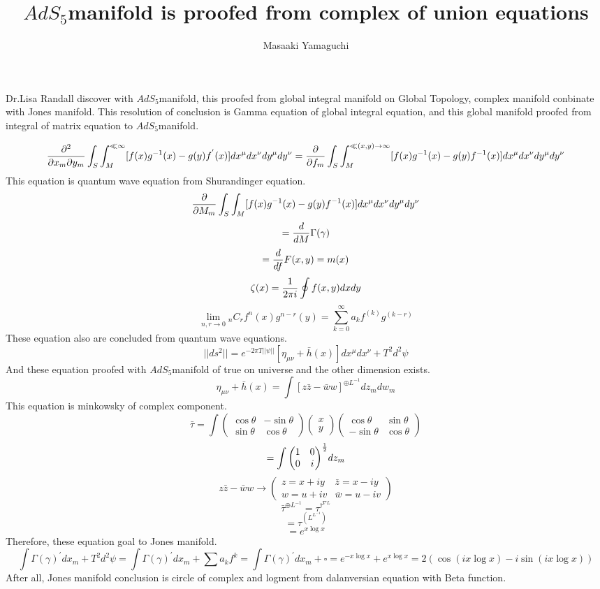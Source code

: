 \documentclass{jsarticle}
\begin{document}
\title{$AdS_5$manifold is proofed from complex of union equations}
\author{Masaaki Yamaguchi}
\date{}
\maketitle

  Dr.Lisa Randall discover with $AdS_5$manifold,
  this proofed from global integral manifold on Global Topology,
  complex manifold conbinate with Jones manifold.
  This resolution of conclusion is Gamma equation of global integral equation,
  and this global manifold proofed from integral of matrix equation to
  $AdS_5$manifold.

  $$ {\partial^2 \over {\partial x_m \partial y_m}} \int_S \int_M^{\ll \infty}
  [f(x)g^{-1}(x) - g(y)f^{'}(x)]dx^{\mu}dx^{\nu}dy^{\mu}dy^{\nu}
  = {\partial \over {\partial f_m}}\int_S \int_M^{\ll(x,y) \to \infty}
  [f(x)g^{-1}(x) - g(y)f^{-1}(x)] dx^{\mu}dx^{\nu}dy^{\mu}dy^{\nu} $$
  This equation is quantum wave equation from Shurandinger equation.
  $$ {\partial \over {\partial M_m}}\int_S \int_M [f(x)g^{-1}(x)
  - g(y)f^{-1}(x)]  dx^{\mu}dx^{\nu}dy^{\mu}dy^{\nu} $$
  $$ = {d \over {dM}}\Gamma(\gamma) $$
  $$ = {d \over df}F(x,y) = m(x) $$
  $$ \zeta(x) = {1 \over {2 \pi i}}\oint f(x,y)dxdy $$
  $$ \lim_{n,r \to 0} {}_n C_r f^{n}(x)g^{n-r}(y) = 
  \sum_{k=0}^{\infty} a_k f^{(k)}g^{(k-r)} $$
  These equation also are concluded from quantum wave equations.
  $$ ||ds^2|| = e^{-2 \pi T ||\psi||}[\eta_{\mu\nu} + \bar{h}(x)]dx^{\mu}
  dx^{\nu} + T^2 d^2 \psi $$
  And these equation proofed with $ AdS_5 $manifold of true on universe
  and the other dimension exists.
  $$ \eta_{\mu\nu} + \bar{h}(x) = \int[z\bar{z} - \bar{w}w]^{\oplus L^{-1}}
  dz_m dw_m $$
  This equation is minkowsky of complex component.
  $$ \bar{\tau} = \int \begin{pmatrix} \cos \theta & - \sin \theta \\
  \sin \theta & \cos \theta \end{pmatrix} \begin{pmatrix} x \\
  y \end{pmatrix} \begin{pmatrix} \cos \theta &  \sin \theta \\
  - \sin \theta & \cos \theta \end{pmatrix} $$
  $$ = \int {\begin{pmatrix} 1 & 0 \\
  0 & i \end{pmatrix}}^{1 \over 2} dz_m  $$
  $$ z\bar{z} - \bar{w}w \to \begin{pmatrix} {z = x + iy} & {\bar{z} =
	  x - iy} \\
  {w = u + iv} & {\bar{w} = u - iv} \end{pmatrix} $$
  $$ \bar{\tau}^{\oplus L^{-1}} = \tau^{\bar{\tau}^{\nabla L}}$$
  $$ = \tau^{(L^{L^{-1}})}$$
  $$ = e^{x \log x} $$
  Therefore, these equation goal to Jones manifold.
  $$ \int \Gamma(\gamma)^{'}dx_m + T^2d^2 \psi = \int \Gamma(\gamma)^{'}dx_m
  + \sum a_k f^k = \int \Gamma(\gamma)^{'}dx_m + \square = e^{-x \log x}
  + e^{x \log x} = 2(\cos(i x \log x) - i \sin(i x \log x)) $$
  After all, Jones manifold conclusion is circle of complex and logment
  from dalanversian equation with Beta function.
\end{document}
